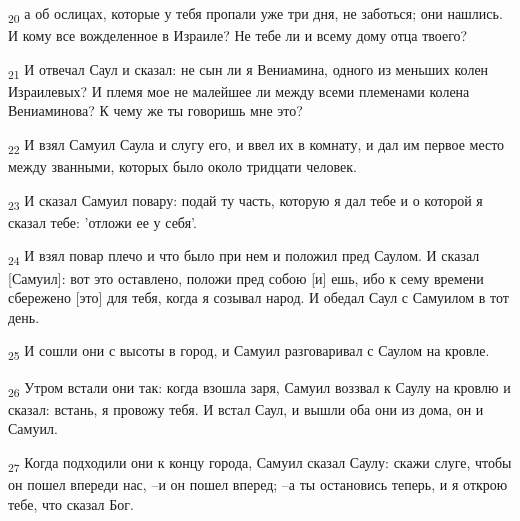 \begin{tcolorbox}
\textsubscript{20} а об ослицах, которые у тебя пропали уже три дня, не заботься; они нашлись. И кому все вожделенное в Израиле? Не тебе ли и всему дому отца твоего?
\end{tcolorbox}
\begin{tcolorbox}
\textsubscript{21} И отвечал Саул и сказал: не сын ли я Вениамина, одного из меньших колен Израилевых? И племя мое не малейшее ли между всеми племенами колена Вениаминова? К чему же ты говоришь мне это?
\end{tcolorbox}
\begin{tcolorbox}
\textsubscript{22} И взял Самуил Саула и слугу его, и ввел их в комнату, и дал им первое место между званными, которых было около тридцати человек.
\end{tcolorbox}
\begin{tcolorbox}
\textsubscript{23} И сказал Самуил повару: подай ту часть, которую я дал тебе и о которой я сказал тебе: 'отложи ее у себя'.
\end{tcolorbox}
\begin{tcolorbox}
\textsubscript{24} И взял повар плечо и что было при нем и положил пред Саулом. И сказал [Самуил]: вот это оставлено, положи пред собою [и] ешь, ибо к сему времени сбережено [это] для тебя, когда я созывал народ. И обедал Саул с Самуилом в тот день.
\end{tcolorbox}
\begin{tcolorbox}
\textsubscript{25} И сошли они с высоты в город, и Самуил разговаривал с Саулом на кровле.
\end{tcolorbox}
\begin{tcolorbox}
\textsubscript{26} Утром встали они так: когда взошла заря, Самуил воззвал к Саулу на кровлю и сказал: встань, я провожу тебя. И встал Саул, и вышли оба они из дома, он и Самуил.
\end{tcolorbox}
\begin{tcolorbox}
\textsubscript{27} Когда подходили они к концу города, Самуил сказал Саулу: скажи слуге, чтобы он пошел впереди нас, --и он пошел вперед; --а ты остановись теперь, и я открою тебе, что сказал Бог.
\end{tcolorbox}
